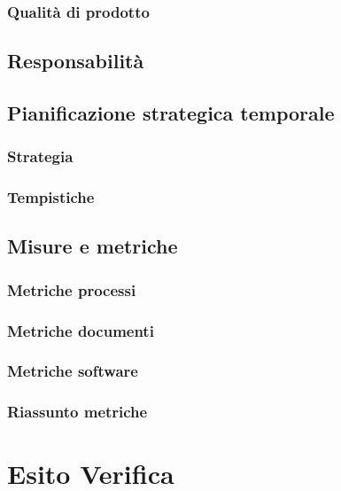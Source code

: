 \documentclass[a4paper, oneside, openany, dvipsnames, table]{article}
\begin{document}
		\subsubsection{Qualità di prodotto}
			
	\subsection{Responsabilità}
		
	\subsection{Pianificazione strategica temporale}
		\subsubsection{Strategia}
			
		\subsubsection{Tempistiche}
			
	\subsection{Misure e metriche}
	\label{sec:metriche}
		
		\subsubsection{Metriche processi}
			
		\subsubsection{Metriche documenti}
			
		\subsubsection{Metriche software}
			
		\subsubsection{Riassunto metriche}
			


\appendix
{}

\newpage
\section{Esito Verifica}
	\label{app:misure}
\end{document}

